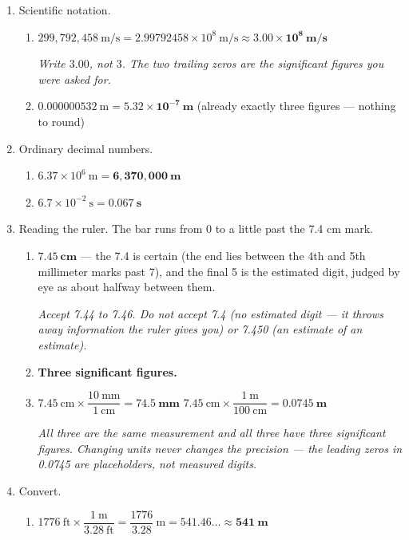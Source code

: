 \documentclass[12pt, twoside]{article}
\begin{document}
\begin{enumerate}[itemsep=0.25cm]
\item Scientific notation.
  \begin{enumerate}[itemsep=0.15cm]
    \item $299{,}792{,}458~\text{m/s} = 2.99792458 \times 10^{8}~\text{m/s}
      \approx \mathbf{3.00 \times 10^{8}~\textbf{m/s}}$

      \emph{Write $3.00$, not $3$. The two trailing zeros are the significant figures you
      were asked for.}
    \item $0.000000532~\text{m} = \mathbf{5.32 \times 10^{-7}~\textbf{m}}$
      \quad (already exactly three figures --- nothing to round)
  \end{enumerate}

\item Ordinary decimal numbers.
  \begin{enumerate}[itemsep=0.15cm]
    \item $6.37 \times 10^{6}~\text{m} = \mathbf{6{,}370{,}000~\textbf{m}}$
    \item $6.7 \times 10^{-2}~\text{s} = \mathbf{0.067~\textbf{s}}$
  \end{enumerate}

\item Reading the ruler. The bar runs from 0 to a little past the 7.4 cm mark.
  \begin{enumerate}[itemsep=0.15cm]
    \item $\mathbf{7.45~\textbf{cm}}$ --- the 7.4 is certain (the end lies between the
      4th and 5th millimeter marks past 7), and the final 5 is the estimated digit,
      judged by eye as about halfway between them.

      \emph{Accept 7.44 to 7.46. Do not accept 7.4 (no estimated digit --- it throws away
      information the ruler gives you) or 7.450 (an estimate of an estimate).}
    \item \textbf{Three significant figures.}
    \item $7.45~\text{cm} \times \dfrac{10~\text{mm}}{1~\text{cm}} = \mathbf{74.5~\textbf{mm}}$
      \qquad
      $7.45~\text{cm} \times \dfrac{1~\text{m}}{100~\text{cm}} = \mathbf{0.0745~\textbf{m}}$

      \emph{All three are the same measurement and all three have three significant
      figures. Changing units never changes the precision --- the leading zeros in
      0.0745 are placeholders, not measured digits.}
  \end{enumerate}

\item Convert.
  \begin{enumerate}[itemsep=0.15cm]
    \item $1776~\text{ft} \times \dfrac{1~\text{m}}{3.28~\text{ft}}
      = \dfrac{1776}{3.28}~\text{m} = 541.46\ldots \approx \mathbf{541~\textbf{m}}$


\end{enumerate}
\end{enumerate}
\end{document}
